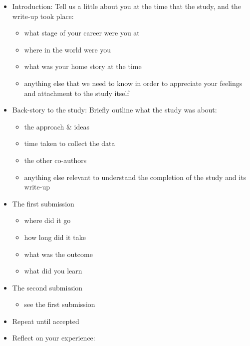 \documentclass[
]{krantz}
\providecommand{\tightlist}{%
  \setlength{\itemsep}{0pt}\setlength{\parskip}{0pt}}
\begin{document}
\begin{itemize}
\item
  Introduction: Tell us a little about you at the time that the study,
  and the write-up took place:

  \begin{itemize}
  \item
    what stage of your career were you at
  \item
    where in the world were you
  \item
    what was your home story at the time
  \item
    anything else that we need to know in order to appreciate your
    feelings and attachment to the study itself
  \end{itemize}
\item
  Back-story to the study: Briefly outline what the study was about:

  \begin{itemize}
  \item
    the approach \& ideas
  \item
    time taken to collect the data
  \item
    the other co-authors
  \item
    anything else relevant to understand the completion of the study
    and its write-up
  \end{itemize}
\item
  The first submission

  \begin{itemize}
  \item
    where did it go
  \item
    how long did it take
  \item
    what was the outcome
  \item
    what did you learn
  \end{itemize}
\item
  The second submission

  \begin{itemize}
  \tightlist
  \item
    see the first submission
  \end{itemize}
\item
  Repeat until accepted
\item
  Reflect on your experience:


\end{itemize}
\end{document}
